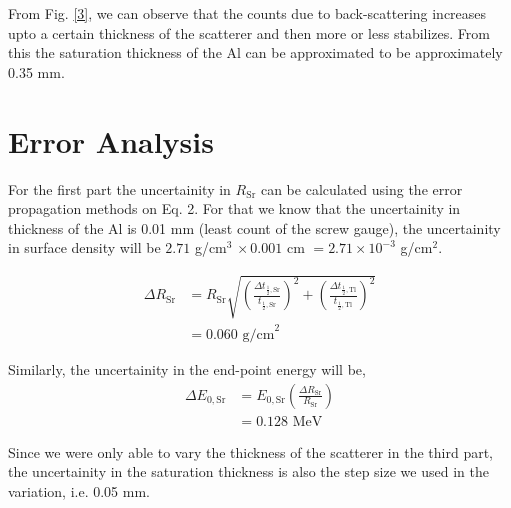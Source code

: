 From Fig. \ref{3}, we can observe that the counts due to back-scattering increases upto a certain thickness of the scatterer and then more or less stabilizes. From this the saturation thickness of the Al can be approximated to be approximately 0.35 mm.

\section{Error Analysis}

For the first part the uncertainity in $R_\text{Sr}$ can be calculated using the error propagation methods on Eq. 2. For that we know that the uncertainity in thickness of the Al is 0.01 mm (least count of the screw gauge), the uncertainity in surface density will be $2.71$ g/cm$^3$ $\times\,0.001$ cm $=2.71\times 10^{-3}$ g/cm$^2$.

\begin{align*}
    \Delta R_{\text{Sr}} &= R_{\text{Sr}} \sqrt{\left(\frac{\Delta t_{\frac{1}{2},\text{Sr}}}{t_{\frac{1}{2},\text{Sr}}}\right)^2 + \left(\frac{\Delta t_{\frac{1}{2},\text{Tl}}}{t_{\frac{1}{2},\text{Tl}}}\right)^2}\\
    &= 0.060 \text{ g/cm}^2
\end{align*}

Similarly, the uncertainity in the end-point energy will be,
\begin{align*}
    \Delta E_{0, \text{Sr}} &= E_{0, \text{Sr}} \left(\frac{\Delta R_{\text{Sr}}}{R_{\text{Sr}}}\right)\\
    &= 0.128 \text{ MeV}
\end{align*}

Since we were only able to vary the thickness of the scatterer in the third part, the uncertainity in the saturation thickness is also the step size we used in the variation, i.e. 0.05 mm.

